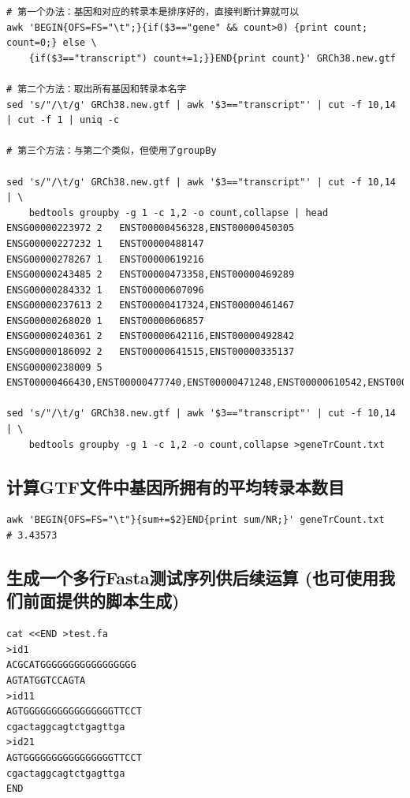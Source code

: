 \documentclass[]{article}
\numberwithin{figure}{section}
\numberwithin{table}{section}
\begin{document}
\begin{verbatim}
# 第一个办法：基因和对应的转录本是排序好的，直接判断计算就可以
awk 'BEGIN{OFS=FS="\t";}{if($3=="gene" && count>0) {print count; count=0;} else \
	{if($3=="transcript") count+=1;}}END{print count}' GRCh38.new.gtf

# 第二个方法：取出所有基因和转录本名字
sed 's/"/\t/g' GRCh38.new.gtf | awk '$3=="transcript"' | cut -f 10,14 | cut -f 1 | uniq -c

# 第三个方法：与第二个类似，但使用了groupBy

sed 's/"/\t/g' GRCh38.new.gtf | awk '$3=="transcript"' | cut -f 10,14 | \
	bedtools groupby -g 1 -c 1,2 -o count,collapse | head
ENSG00000223972	2	ENST00000456328,ENST00000450305
ENSG00000227232	1	ENST00000488147
ENSG00000278267	1	ENST00000619216
ENSG00000243485	2	ENST00000473358,ENST00000469289
ENSG00000284332	1	ENST00000607096
ENSG00000237613	2	ENST00000417324,ENST00000461467
ENSG00000268020	1	ENST00000606857
ENSG00000240361	2	ENST00000642116,ENST00000492842
ENSG00000186092	2	ENST00000641515,ENST00000335137
ENSG00000238009	5	ENST00000466430,ENST00000477740,ENST00000471248,ENST00000610542,ENST00000453576

sed 's/"/\t/g' GRCh38.new.gtf | awk '$3=="transcript"' | cut -f 10,14 | \
	bedtools groupby -g 1 -c 1,2 -o count,collapse >geneTrCount.txt
\end{verbatim}

\hypertarget{gtf_transcript_num}{%
\subsection{计算GTF文件中基因所拥有的平均转录本数目}\label{gtf_transcript_num}}

\begin{verbatim}
awk 'BEGIN{OFS=FS="\t"}{sum+=$2}END{print sum/NR;}' geneTrCount.txt
# 3.43573
\end{verbatim}

\hypertarget{fasta}{%
\subsection{生成一个多行Fasta测试序列供后续运算 (也可使用我们前面提供的脚本生成)}\label{fasta}}

\begin{verbatim}
cat <<END >test.fa
>id1
ACGCATGGGGGGGGGGGGGGGGG
AGTATGGTCCAGTA
>id11
AGTGGGGGGGGGGGGGGGGTTCCT
cgactaggcagtctgagttga
>id21
AGTGGGGGGGGGGGGGGGGTTCCT
cgactaggcagtctgagttga
END
\end{verbatim}
\end{document}
